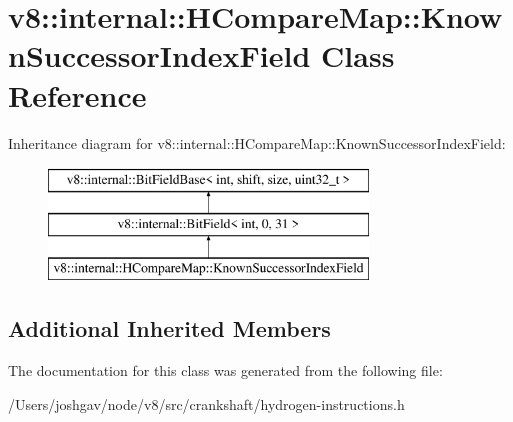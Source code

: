 \hypertarget{classv8_1_1internal_1_1_h_compare_map_1_1_known_successor_index_field}{}\section{v8\+:\+:internal\+:\+:H\+Compare\+Map\+:\+:Known\+Successor\+Index\+Field Class Reference}
\label{classv8_1_1internal_1_1_h_compare_map_1_1_known_successor_index_field}
Inheritance diagram for v8\+:\+:internal\+:\+:H\+Compare\+Map\+:\+:Known\+Successor\+Index\+Field\+:\begin{figure}[H]
\begin{center}
\leavevmode
\includegraphics[height=3.000000cm]{classv8_1_1internal_1_1_h_compare_map_1_1_known_successor_index_field}
\end{center}
\end{figure}
\subsection*{Additional Inherited Members}


The documentation for this class was generated from the following file\+:\begin{DoxyCompactItemize}
\item 
/\+Users/joshgav/node/v8/src/crankshaft/hydrogen-\/instructions.\+h\end{DoxyCompactItemize}
